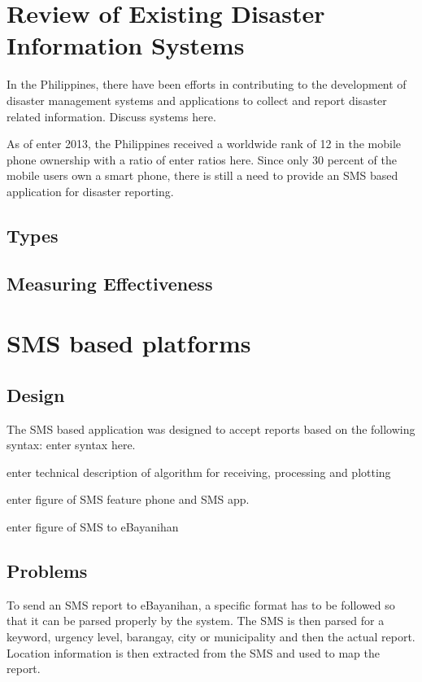 \documentclass{acm_proc_article-sp}
\begin{document}
\section{Review of Existing Disaster Information Systems}

In the Philippines, there have been efforts in contributing to the development of disaster management systems and applications to collect and report disaster related information. Discuss systems here.

As of enter 2013, the Philippines received a worldwide rank of 12 in the mobile phone ownership with a ratio of enter ratios here. Since only 30 percent of the mobile users own a smart phone, there is still a need to provide an SMS based application for disaster reporting.

\subsection{Types}

\subsection{Measuring Effectiveness}

\section{SMS based platforms}
\subsection{Design}
The SMS based application was designed to accept reports based on the following syntax:
enter syntax here.

enter technical description of algorithm for receiving, processing and plotting

enter figure of SMS feature phone and SMS app.

enter figure of SMS to eBayanihan

\subsection{Problems}

To send an SMS report to eBayanihan, a specific format has to be followed so that it can 
be parsed properly by the system. The SMS is then parsed for a keyword, urgency level, barangay,
city or municipality and then the actual report. Location information is then extracted from the SMS
and used to map the report. 
\end{document}
